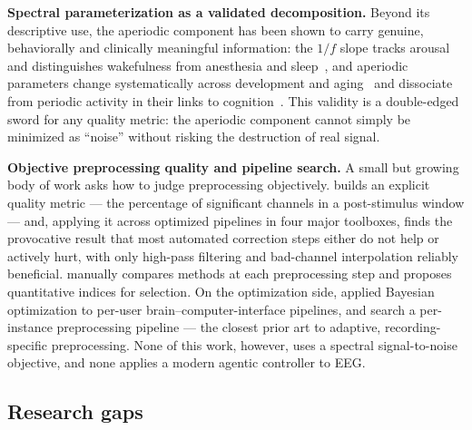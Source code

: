 \textbf{Spectral parameterization as a validated decomposition.} Beyond its descriptive use, the aperiodic component has been shown to carry genuine, behaviorally and clinically meaningful information: the $1/f$ slope tracks arousal and distinguishes wakefulness from anesthesia and sleep~\cite{LendnerEtAl2020}, and aperiodic parameters change systematically across development and aging~\cite{HillEtAl2022, MerkinEtAl2022} and dissociate from periodic activity in their links to cognition~\cite{ThuwalEtAl2021, WilsonEtAl2022, OstlundEtAl2022}. This validity is a double-edged sword for any quality metric: the aperiodic component cannot simply be minimized as ``noise'' without risking the destruction of real signal.

\textbf{Objective preprocessing quality and pipeline search.} A small but growing body of work asks how to judge preprocessing objectively. \citet{Delorme2023} builds an explicit quality metric --- the percentage of significant channels in a post-stimulus window --- and, applying it across optimized pipelines in four major toolboxes, finds the provocative result that most automated correction steps either do not help or actively hurt, with only high-pass filtering and bad-channel interpolation reliably beneficial. \citet{CoelliEtAl2023} manually compares methods at each preprocessing step and proposes quantitative indices for selection. On the optimization side, \citet{BashashatiEtAl2016} applied Bayesian optimization to per-user brain--computer-interface pipelines, and \citet{MartinezEtAl2023} search a per-instance preprocessing pipeline --- the closest prior art to adaptive, recording-specific preprocessing. None of this work, however, uses a spectral signal-to-noise objective, and none applies a modern agentic controller to EEG.

\subsection{Research gaps}

